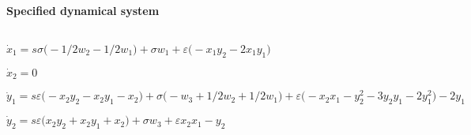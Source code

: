 
\begin{math}
\end{math}
\paragraph{Specified dynamical system}
\begin{math}
\end{math}\par

\begin{math}
\dot x_{1}=s \sigma  \big(-1/2 w_{2}-1/2 w_{1}\big)+\sigma  w_{1}+
\varepsilon  \big(-x_{1} y_{2}-2 x_{1} y_{1}\big)
\end{math}\par

\begin{math}
\dot x_{2}=0
\end{math}\par

\begin{math}
\dot y_{1}=s \varepsilon  \big(-x_{2} y_{2}-x_{2} y_{1}-x_{2}\big)+
\sigma  \big(-w_{3}+1/2 w_{2}+1/2 w_{1}\big)+\varepsilon  \big(-x_{2} x_
{1}-y_{2}^{2}-3 y_{2} y_{1}-2 y_{1}^{2}\big)-2 y_{1}
\end{math}\par

\begin{math}
\dot y_{2}=s \varepsilon  \big(x_{2} y_{2}+x_{2} y_{1}+x_{2}\big)+
\sigma  w_{3}+\varepsilon  x_{2} x_{1}-y_{2}
\end{math}\par
